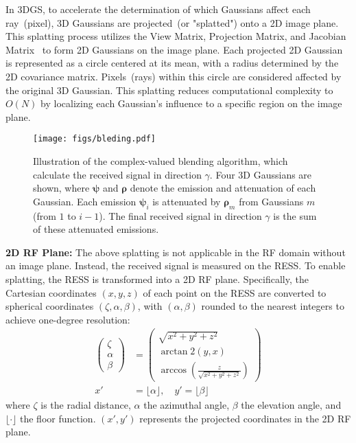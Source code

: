 In 3DGS, to accelerate the determination of which Gaussians affect each ray~(pixel), 3D Gaussians are projected~(or "splatted") onto a 2D image plane.  
This splatting process utilizes the View Matrix, Projection Matrix, and Jacobian Matrix~\cite{takikawa2021neural} to form 2D Gaussians on the image plane.  
Each projected 2D Gaussian is represented as a circle centered at its mean, with a radius determined by the 2D covariance matrix.  
Pixels~(rays) within this circle are considered affected by the original 3D Gaussian.  
This splatting reduces computational complexity to \(O(N)\) by localizing each Gaussian’s influence to a specific region on the image plane.

 
\begin{figure}[!tp]	{\texttt{[image: figs/bleding.pdf]}}
    \caption{Illustration of the complex-valued blending algorithm, which calculate the received signal in direction \(\gamma\). Four 3D Gaussians are shown, where \(\boldsymbol{\psi}\) and \(\boldsymbol{\rho}\) denote the emission and attenuation of each Gaussian. Each emission \(\boldsymbol{\psi}_i\) is attenuated by \(\boldsymbol{\rho}_m\) from Gaussians \(m\) (from \(1\) to \(i - 1\)). The final received signal in direction \(\gamma\) is the sum of these attenuated emissions.}
\label{fig_blending}
 \Description[]{}
\end{figure}


\textbf{2D RF Plane:}  
The above splatting is not applicable in the RF domain without an image plane.   
Instead, the received signal is measured on the RESS.
To enable splatting, the RESS is transformed into a 2D RF plane.  
Specifically, the Cartesian coordinates \((x, y, z)\) of each point on the RESS are converted to spherical coordinates \((\zeta, \alpha, \beta)\), with \((\alpha, \beta)\) rounded to the nearest integers to achieve one-degree resolution:
\begin{equation}
\label{eqn_projection}
\begin{aligned}
\begin{pmatrix}
\zeta \\
\alpha \\
\beta
\end{pmatrix}
&=
\begin{pmatrix}
\sqrt{x^2 + y^2 + z^2} \\
\arctan2\left(y, x\right) \\
\arccos\left(\frac{z}{\sqrt{x^2 + y^2 + z^2}}\right)
\end{pmatrix} \\
x' &= \lfloor \alpha \rfloor, \quad y' = \lfloor \beta \rfloor
\end{aligned}
\end{equation}
where \(\zeta\) is the radial distance, \(\alpha\) the azimuthal angle, \(\beta\) the elevation angle, and \(\lfloor \cdot \rfloor\) the floor function.  
\(\left(x', y'\right)\) represents the projected coordinates in the 2D RF plane.


